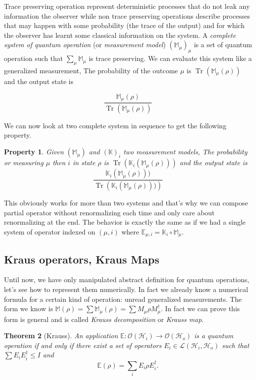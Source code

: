 \documentclass[10pt,a4paper]{report}
\theoremstyle{plain}
\newtheorem{thm}{Theorem}[chapter]
\newtheorem{prop}[thm]{Property}
\theoremstyle{definition}
\theoremstyle{remark}
\DeclareMathOperator{\Tr}{Tr}
\newcommand{\trnorm}[1]{\frac{#1}{\Tr\left({#1}\right)}}
\begin{document}
Trace preserving operation represent deterministic processes
that do not leak any information the observer while non trace preserving operations describe
processes that may happen with some probability (the trace of the output) and for which the
observer has learnt some classical information on the system. A \emph{complete system of
  quantum operation} (or \emph{measurement model}) ${(\mathbb{M}_\mu)}_\mu$ is a set of quantum
operation such that $\sum_\mu \mathbb M_\mu$ is trace preserving. We can evaluate
this system like a generalized measurement, The probability of the outcome $\mu$
is $\Tr(\mathbb M_\mu(\rho))$ and the output state is

\[\trnorm{\mathbb M_\mu(\rho)}\]

We can now look at two complete system in sequence to get the following
property.

\begin{prop}\label{prop:qocomp}
  Given $(\mathbb M_\mu)$ and $(\mathbb K)_i$ two measurement models, The
  probability or measuring $\mu$ then $i$ in state $\rho$
  is $\Tr(\mathbb K_i (\mathbb M_\mu(\rho)))$ and the output state is
  \[\trnorm{\mathbb K_i (\mathbb M_\mu(\rho)))}\]
\end{prop}

This obviously works for more than two systems and that's why we can compose
partial operator without renormalizing each time and only care about
renormalizing at the end. The behavior is exactly the same as if we had a single
system of operator indexed on $(\mu,i)$ where $\mathbb E_{\mu,i} = \mathbb K_i \circ
\mathbb M_\mu$.

\subsection{Kraus operators, Kraus Maps}\label{ssec:kraus}

Until now, we have only manipulated abstract definition for quantum operations, let's
see how to represent them numerically. In fact we already know a numerical
formula for a certain kind of operation: unread generalized measurements. The
form we know is $\mathbb{M}(\rho) = \sum \mathbb M_\mu(\rho) = \sum M_\mu\rho
M_\mu^\dagger$. In fact we can prove this form is general and is called
\emph{Krauss decomposition} or \emph{Krauss map}.

\begin{thm}[Krauss]
  An application $\mathbb E : \mathcal{O}(\mathcal{H}_i) \to
  \mathcal{O}(\mathcal{H}_o)$ is a quantum operation if and only if there exist
  a set of operators $E_i \in \mathcal{L}(\mathcal{H}_i, \mathcal{H}_o)$ such
  that $\sum E_i E_i^\dagger \le I$ and
  \[\mathbb E(\rho) = \sum_i E_i\rho E_i^\dagger.\]
\end{thm}
\end{document}
